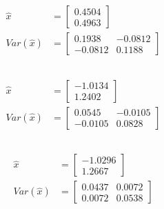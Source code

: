 \documentclass{article}
\theoremstyle{definition} %
\begin{document}
\subsection{}

\begin{align*}
    \hat x &= 
    \begin{bmatrix}
        0.4504\\
        0.4963
    \end{bmatrix}\\
    Var(\hat x) &=
    \begin{bmatrix}
        0.1938&-0.0812\\
        -0.0812&0.1188
    \end{bmatrix}
\end{align*}

\subsection{}

\begin{align*}
    \hat x &= 
    \begin{bmatrix}
        -1.0134\\
        1.2402
    \end{bmatrix}\\
    Var(\hat x) &=
    \begin{bmatrix}
        0.0545&-0.0105\\
        -0.0105&0.0828
    \end{bmatrix}
\end{align*}

\subsection{}

\begin{align*}
    \hat x &= 
    \begin{bmatrix}
        -1.0296\\
        1.2667
    \end{bmatrix}\\
    Var(\hat x) &=
    \begin{bmatrix}
        0.0437&0.0072\\
        0.0072&0.0538
    \end{bmatrix}
\end{align*}

\section{}
\end{document}

